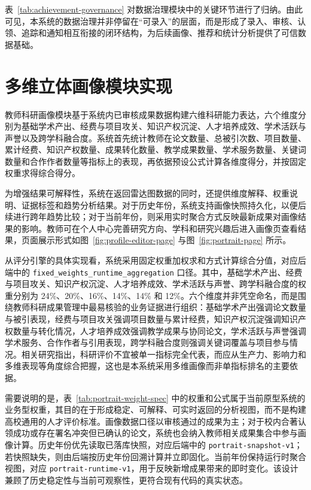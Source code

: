 \documentclass[12pt,a4paper]{ctexbook}
\begin{document}
表~\ref{tab:achievement-governance} 对数据治理模块中的关键环节进行了归纳。由此可见，本系统的数据治理并非停留在“可录入”的层面，而是形成了录入、审核、认领、追踪和通知相互衔接的闭环结构，为后续画像、推荐和统计分析提供了可信数据基础。

\section{多维立体画像模块实现}
教师科研画像模块基于系统内已审核成果数据构建六维科研能力表达，六个维度分别为基础学术产出、经费与项目攻关、知识产权沉淀、人才培养成效、学术活跃与声誉以及跨学科融合度。系统首先统计教师在论文数量、总被引次数、项目数量、累计经费、知识产权数量、成果转化数量、教学成果数量、学术服务数量、关键词数量和合作作者数量等指标上的表现，再依据预设公式计算各维度得分，并按固定权重求得综合得分。

为增强结果可解释性，系统在返回雷达图数据的同时，还提供维度解释、权重说明、证据标签和趋势分析结果。对于历史年份，系统支持画像快照持久化，以便后续进行跨年趋势比较；对于当前年份，则采用实时聚合方式反映最新成果对画像结果的影响。教师可在个人中心完善研究方向、学科和研究兴趣后进入画像页查看结果，页面展示形式如图~\ref{fig:profile-editor-page} 与图~\ref{fig:portrait-page} 所示。

从评分引擎的具体实现看，系统采用固定权重加权求和方式计算综合分值，对应后端中的 \texttt{fixed\_weights\_runtime\_aggregation} 口径。其中，基础学术产出、经费与项目攻关、知识产权沉淀、人才培养成效、学术活跃与声誉、跨学科融合度的权重分别为 24\%、20\%、16\%、14\%、14\% 和 12\%。六个维度并非凭空命名，而是围绕教师科研成果管理中最易核验的业务证据进行组织：基础学术产出强调论文数量与被引表现，经费与项目攻关强调项目数量与累计经费，知识产权沉淀强调知识产权数量与转化情况，人才培养成效强调教学成果与协同论文，学术活跃与声誉强调学术服务、合作作者与引用表现，跨学科融合度则强调关键词覆盖与项目参与情况。相关研究指出，科研评价不宜被单一指标完全代表，而应从生产力、影响力和多维表现等角度综合把握\cite{h_index_2005}\cite{research_productivity_2011}\cite{scientific_impact_2020}，这也是本系统采用多维画像而非单指标排名的主要依据。

需要说明的是，表~\ref{tab:portrait-weight-spec} 中的权重和公式属于当前原型系统的业务型权重，其目的在于形成稳定、可解释、可实时返回的分析视图，而不是构建高校通用的人才评价标准。画像数据口径以审核通过的成果为主；对于校内合著认领成功或存在署名冲突但已确认的论文，系统也会纳入教师相关成果集合中参与画像计算。历史年份优先读取已落库快照，对应后端中的 \texttt{portrait-snapshot-v1}；若快照缺失，则由后端按历史年份回溯计算并立即固化。当前年份保持运行时聚合视图，对应 \texttt{portrait-runtime-v1}，用于反映新增成果带来的即时变化。该设计兼顾了历史稳定性与当前可观察性，更符合现有代码的真实状态。
\end{document}
